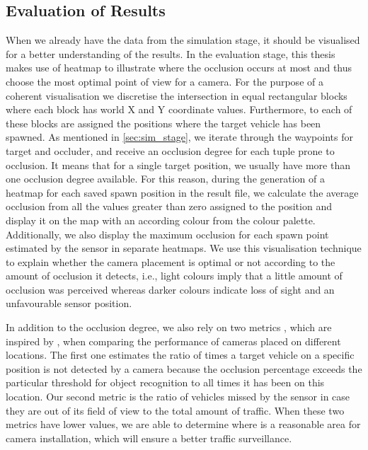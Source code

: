 \subsection{Evaluation of Results} \label{subsec:results_eval}
When we already have the data from the simulation stage, it should be visualised for a better understanding of the results. In the evaluation stage, this thesis makes use of heatmap to illustrate where the occlusion occurs at most and thus choose the most optimal point of view for a camera. For the purpose of a coherent visualisation we discretise the intersection in equal rectangular blocks where each block has world X and Y coordinate values. Furthermore, to each of these blocks are assigned the positions where the target vehicle has been spawned. As mentioned in \ref{sec:sim_stage}, we iterate through the waypoints for target and occluder, and receive an occlusion degree for each tuple prone to occlusion. It means that for a single target position, we usually have more than one occlusion degree available. For this reason, during the generation of a heatmap for each saved spawn position in the result file, we calculate the average occlusion from all the values greater than zero assigned to the position and display it on the map with an according colour from the colour palette. Additionally, we also display the maximum occlusion for each spawn point estimated by the sensor in separate heatmaps. We use this visualisation technique to explain whether the camera placement is optimal or not according to the amount of occlusion it detects, i.e., light colours imply that a little amount of occlusion was perceived whereas darker colours indicate loss of sight and an unfavourable sensor position.

In addition to the occlusion degree, we also rely on two metrics , which are inspired by \cite{occlusion_degree_model}, when comparing the performance of cameras placed on different locations. The first one estimates the ratio of times a target vehicle on a specific position is not detected by a camera because the occlusion percentage exceeds the particular threshold for object recognition to all times it has been on this location. Our second metric is the ratio of vehicles missed by the sensor in case they are out of its field of view to the total amount of traffic. When these two metrics have lower values, we are able to determine where is a reasonable area for camera installation, which will ensure a better traffic surveillance. 
